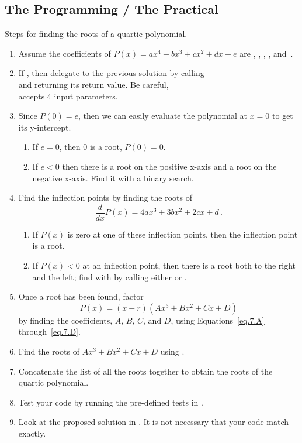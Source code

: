 \subsection{The Programming / The Practical}

Steps for finding the roots of a quartic polynomial.

\begin{enumerate}
\item Assume the coefficients of $P(x) = a x^4 + b x^3 + c x^2 + d x + e$ are
  ,  ,  ,  , and~.
\item If , then delegate to the previous solution by
  calling \\
   and returning its return
  value.  Be careful, \\
   accepts 4 input
  parameters.
\item Since $P(0) = e$, then we can easily evaluate the polynomial at
  $x=0$ to get its y-intercept.
  \begin{enumerate}
  \item If $e = 0$, then 0 is a root, $P(0) = 0$.
  \item If $e<0$ then there is a root on the positive x-axis and a
    root on the negative x-axis.  Find it with a binary search.
  \end{enumerate}
\item Find the inflection points by finding the roots
  of \[\frac{d}{d x} P(x) = 4 a x^3 + 3 b x^2 + 2 c x + d\,.\]
  \begin{enumerate}
  \item If $P(x)$ is zero at one of these inflection points, then the
    inflection point is a root.
  \item If $P(x) < 0$ at an inflection point, then there is a root
    both to the right and the left; find with by calling either
     or .
  \end{enumerate}
\item Once a root has been found, factor \[P(x) = (x-r)(A x^3 + B x^2 +
  C x + D)\] by finding the coefficients, $A$, $B$, $C$, and $D$, using
  Equations~\eqref{eq.7.A} through~\eqref{eq.7.D}.
\item Find the roots of $A x^3 + B x^2 + C x + D$ using
  .
  \item Concatenate the list of all the roots together to obtain the
    roots of the quartic polynomial.

\item Test your code by running the pre-defined tests in
  .

\item Look at the proposed solution in .
  It is not necessary that your code match exactly.

\end{enumerate}

